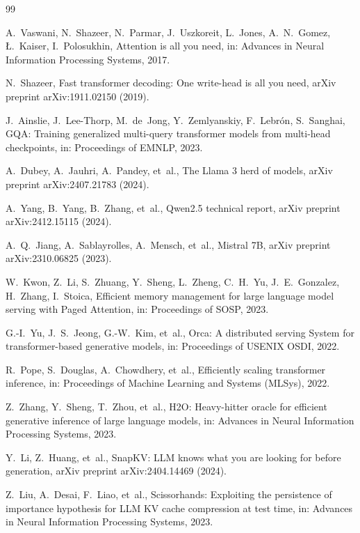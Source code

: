 \documentclass[final,5p,times,twocolumn]{elsarticle}
\theoremstyle{definition}
\theoremstyle{remark}
\begin{document}
\begin{thebibliography}{99}

A.~Vaswani, N.~Shazeer, N.~Parmar, J.~Uszkoreit, L.~Jones,
A.~N.~Gomez, {\L}.~Kaiser, I.~Polosukhin,
Attention is all you need,
in: Advances in Neural Information Processing Systems, 2017.

N.~Shazeer,
Fast transformer decoding: One write-head is all you need,
arXiv preprint arXiv:1911.02150 (2019).

J.~Ainslie, J.~Lee-Thorp, M.~de~Jong, Y.~Zemlyanskiy, F.~Lebr\'on,
S.~Sanghai,
GQA: Training generalized multi-query transformer models from
multi-head checkpoints,
in: Proceedings of EMNLP, 2023.

A.~Dubey, A.~Jauhri, A.~Pandey, et~al.,
The Llama 3 herd of models,
arXiv preprint arXiv:2407.21783 (2024).

A.~Yang, B.~Yang, B.~Zhang, et~al.,
Qwen2.5 technical report,
arXiv preprint arXiv:2412.15115 (2024).

A.~Q.~Jiang, A.~Sablayrolles, A.~Mensch, et~al.,
Mistral 7B,
arXiv preprint arXiv:2310.06825 (2023).

W.~Kwon, Z.~Li, S.~Zhuang, Y.~Sheng, L.~Zheng, C.~H.~Yu,
J.~E.~Gonzalez, H.~Zhang, I.~Stoica,
Efficient memory management for large language model serving with
{Paged  Attention},
in: Proceedings of SOSP, 2023.

G.-I.~Yu, J.~S.~Jeong, G.-W.~Kim, et~al.,
Orca: A distributed serving System for transformer-based generative
models,
in: Proceedings of USENIX OSDI, 2022.

R.~Pope, S.~Douglas, A.~Chowdhery, et~al.,
Efficiently scaling transformer inference,
in: Proceedings of Machine Learning and Systems (MLSys), 2022.

Z.~Zhang, Y.~Sheng, T.~Zhou, et~al.,
H2O: Heavy-hitter oracle for efficient generative inference of large
language models,
in: Advances in Neural Information Processing Systems, 2023.

Y.~Li, Z.~Huang, et~al.,
SnapKV: LLM knows what you are looking for before generation,
arXiv preprint arXiv:2404.14469 (2024).

Z.~Liu, A.~Desai, F.~Liao, et~al.,
Scissorhands: Exploiting the persistence of importance hypothesis for
LLM KV cache compression at test time,
in: Advances in Neural Information Processing Systems, 2023.


\end{thebibliography}
\end{document}
